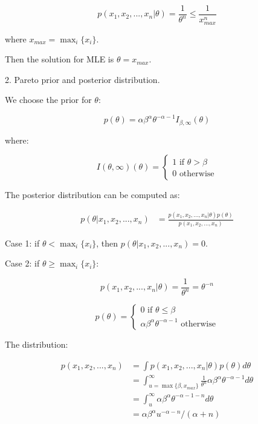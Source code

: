\documentclass{article}
\begin{document}
$$
p(x_1,x_2,...,x_n|\theta) = \frac{1}{\theta^n}\leq \frac{1}{x_{max}^n}
$$

where $x_{max}=\max_{i}\{x_i\}$.

Then the solution for MLE is $\theta=x_{max}$.

2. Pareto prior and posterior distribution.

We choose the prior for $\theta$:

$$
p(\theta) = \alpha\beta^{\alpha}\theta^{-\alpha-1}I_{\beta,\infty}(\theta)
$$

where:

$$
I(\theta,\infty)(\theta) =
\begin{cases}
    1 \text{ if }\theta>\beta\\
    0\text{ otherwise}
\end{cases}
$$

The posterior distribution can be computed as:

\begin{equation}\label{eq8}
    \begin{aligned}
        p(\theta|x_1,x_2,...,x_n)&=\frac{p(x_1,x_2,...,x_n|\theta)p(\theta)}{p(x_1,x_2,...,x_n)}
    \end{aligned}
\end{equation}

Case 1: if $\theta<\max_{i}\{x_i\}$, then $p(\theta|x_1,x_2,...,x_n)=0$.

Case 2: if $\theta\geq\max_{i}\{x_i\}$:

$$
p(x_1,x_2,...,x_n|\theta)=\frac{1}{\theta^n}=\theta^{-n}
$$

$$
p(\theta) = \begin{cases}
    0 \text{ if }\theta\leq \beta\\
    \alpha\beta^{\alpha}\theta^{-\alpha-1} \text{ otherwise}
\end{cases}
$$

The distribution:

\begin{equation}\label{eq9}
    \begin{aligned}
        p(x_1,x_2,...,x_n) &= \int p(x_1,x_2,...,x_n|\theta)p(\theta)d\theta\\
        &=\int_{u=\max\{\beta,x_{max}\}}^{\infty}\frac{1}{\theta^n}\alpha\beta^{\alpha}\theta^{-\alpha-1}d\theta\\
        &=\int_{u}^{\infty}\alpha\beta^{\alpha}\theta^{-\alpha-1-n}d\theta\\
        &=\alpha\beta^{\alpha}u^{-\alpha-n}/(\alpha+n)
    \end{aligned}
\end{equation}
\end{document}
